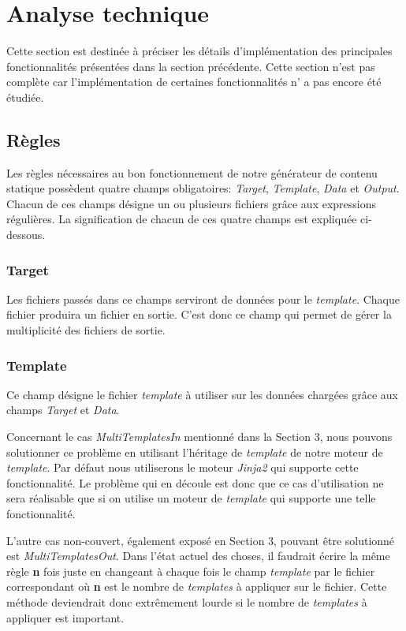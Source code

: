 \section{Analyse technique}
	Cette section est destinée à préciser les détails d'implémentation des principales fonctionnalités présentées dans la section précédente. Cette section n'est pas complète car l'implémentation de certaines fonctionnalités n' a pas encore été étudiée.
	
	\subsection{Règles}
		Les règles nécessaires au bon fonctionnement de notre générateur de contenu statique possèdent quatre champs obligatoires: \textit{Target}, \textit{Template}, \textit{Data} et \textit{Output}. Chacun de ces champs désigne un ou plusieurs fichiers grâce aux expressions régulières. La signification de chacun de ces quatre champs est expliquée ci-dessous. 
		
		\subsubsection*{Target}
			Les fichiers passés dans ce champs serviront de données pour le \textit{template}. Chaque fichier produira un fichier en sortie. C'est donc ce champ qui permet de gérer la multiplicité des fichiers de sortie.
		
		\subsubsection*{Template}
			Ce champ désigne le fichier \textit{template} à utiliser sur les données chargées grâce aux champs \textit{Target} et \textit{Data}. 
			
			Concernant le cas \textit{MultiTemplatesIn} mentionné dans la Section 3, nous pouvons solutionner ce problème en utilisant l'héritage de \textit{template} de notre moteur de \textit{template}. Par défaut nous utiliserons le moteur \textit{Jinja2} \cite{Jinja2} qui supporte cette fonctionnalité. Le problème qui en découle est donc que ce cas d'utilisation ne sera réalisable que si on utilise un moteur de \textit{template} qui supporte une telle fonctionnalité.
			
			L'autre cas non-couvert, également exposé en Section 3, pouvant être solutionné est \textit{MultiTemplatesOut}. Dans l'état actuel des choses, il faudrait écrire la même règle \textbf{n} fois juste en changeant à chaque fois le champ \textit{template} par le fichier correspondant où \textbf{n} est le nombre de \textit{templates} à appliquer sur le fichier. Cette méthode deviendrait donc extrêmement lourde si le nombre de \textit{templates} à appliquer est important.
		
